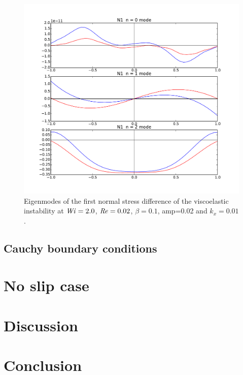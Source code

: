 \documentclass{jfm}
\newcommand\Wi{\mbox{\textit{Wi}}}
\newcommand\Rey{\mbox{\textit{Re}}}  %
\begin{document}
\begin{figure}
    \centering
    \includegraphics[width=\textwidth]{./figures/eigenmode_visco}
    \caption{Eigenmodes of the first normal stress difference of the viscoelastic instability at $\Wi = 2.0$, $\Rey = 0.02$, $\beta=0.1$, amp=0.02 and $k_x = 0.01$.}
    \label{fig:eigenmode_visco}
\end{figure}

\subsection{Cauchy boundary conditions}

\section{No slip case}

\section{Discussion}

\section{Conclusion}
\end{document}
